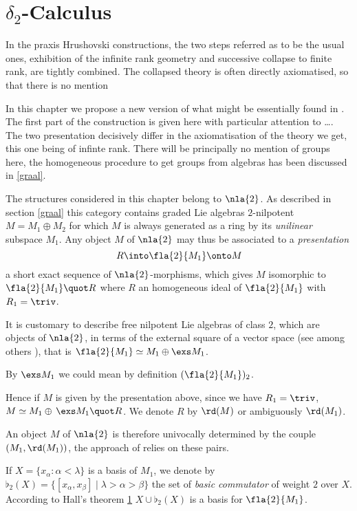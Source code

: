 \section{$\delta_{2}$-Calculus}
In the praxis Hrushovski constructions,
the two steps referred as to be the usual ones,
exhibition of the infinite rank geometry and
successive collapse to finite rank, are tightly
combined. The collapsed theory  is often directly axiomatised,
so that there is no mention 

In this chapter we propose a new version of
what might be essentially found in \cite{BAD96}. The
first part of the construction is given here with
particular attention to \dots. The two presentation decisively differ in the axiomatisation of
the theory we get, this one being of infinte rank. There will be principally no mention of groups here,
the homogeneous procedure to get groups from algebras has been discussed in \ref{graal}.

\bigskip
The structures considered in this chapter belong to $\nla{2}$. As described in section \ref{graal}
this category contains graded Lie algebras $2$-nilpotent $M=M_{1}\oplus M_{2}$ for which $M$ is always generated
as a ring by its {\em unilinear} subspace $M_{1}$.
Any object $M$ of $\nla{2}$ may thus be associated to a {\em presentation}
$$R\into \fla{2}{M_{1}}\onto M$$
a short exact sequence of $\nla{2}$-morphisms, which gives $M$ isomorphic to $\fla{2}{M_{1}}\quot R$ where
$R$ an homogeneous ideal of $\fla{2}{M_{1}}$ with $R_{1}=\triv$. 

It is customary to describe free nilpotent Lie algebras of class $2$, which are objects of $\nla{2}$, in terms of the
external square of a vector space (see among others \cite{}), that is $\fla{2}{M_{1}}\simeq M_{1}\oplus\exs M_{1}$.

By $\exs M_{1}$ we could mean by definition $(\fla{2}{M_{1}})_{2}$.

Hence if $M$ is given by the presentation above, since we have $R_{1}=\triv$, $M\simeq M_{1}\oplus\,\exs M_{1}\quot R$.
We denote $R$ by $\rd(M)$ or ambiguously $\rd(M_{1})$.%

An object $M$ of $\nla{2}$ is therefore univocally determined by the couple $\left(M_{1},\rd(M_{1})\right)$, the approach of \cite{BAD96} relies on these pairs.

\medskip
If $X=\{x_{\alpha}:\alpha<\lambda\}$ is a basis of $M_{1}$, we denote by $\flat_{2}(X)=\{[x_{\alpha},x_{\beta}]\mid\lambda>\alpha>\beta\}$ the set of \emph{basic commutator} of weight $2$ over $X$. According to Hall's theorem \ref{} $X\cup\flat_{2}(X)$
is a basis for $\fla{2}{M_{1}}$.

